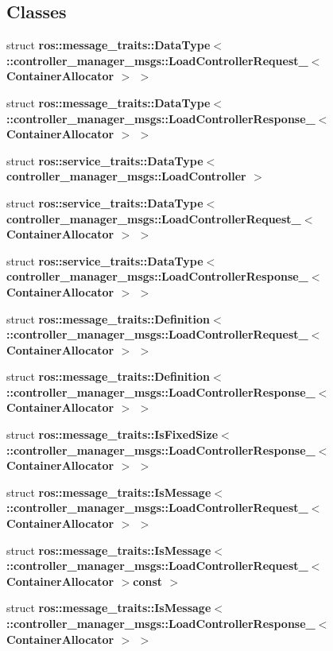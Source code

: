 \subsection*{\-Classes}
\begin{DoxyCompactItemize}
\item 
struct {\bf ros\-::message\-\_\-traits\-::\-Data\-Type$<$ \-::controller\-\_\-manager\-\_\-msgs\-::\-Load\-Controller\-Request\-\_\-$<$ Container\-Allocator $>$ $>$}
\item 
struct {\bf ros\-::message\-\_\-traits\-::\-Data\-Type$<$ \-::controller\-\_\-manager\-\_\-msgs\-::\-Load\-Controller\-Response\-\_\-$<$ Container\-Allocator $>$ $>$}
\item 
struct {\bf ros\-::service\-\_\-traits\-::\-Data\-Type$<$ controller\-\_\-manager\-\_\-msgs\-::\-Load\-Controller $>$}
\item 
struct {\bf ros\-::service\-\_\-traits\-::\-Data\-Type$<$ controller\-\_\-manager\-\_\-msgs\-::\-Load\-Controller\-Request\-\_\-$<$ Container\-Allocator $>$ $>$}
\item 
struct {\bf ros\-::service\-\_\-traits\-::\-Data\-Type$<$ controller\-\_\-manager\-\_\-msgs\-::\-Load\-Controller\-Response\-\_\-$<$ Container\-Allocator $>$ $>$}
\item 
struct {\bf ros\-::message\-\_\-traits\-::\-Definition$<$ \-::controller\-\_\-manager\-\_\-msgs\-::\-Load\-Controller\-Request\-\_\-$<$ Container\-Allocator $>$ $>$}
\item 
struct {\bf ros\-::message\-\_\-traits\-::\-Definition$<$ \-::controller\-\_\-manager\-\_\-msgs\-::\-Load\-Controller\-Response\-\_\-$<$ Container\-Allocator $>$ $>$}
\item 
struct {\bf ros\-::message\-\_\-traits\-::\-Is\-Fixed\-Size$<$ \-::controller\-\_\-manager\-\_\-msgs\-::\-Load\-Controller\-Response\-\_\-$<$ Container\-Allocator $>$ $>$}
\item 
struct {\bf ros\-::message\-\_\-traits\-::\-Is\-Message$<$ \-::controller\-\_\-manager\-\_\-msgs\-::\-Load\-Controller\-Request\-\_\-$<$ Container\-Allocator $>$ $>$}
\item 
struct {\bf ros\-::message\-\_\-traits\-::\-Is\-Message$<$ \-::controller\-\_\-manager\-\_\-msgs\-::\-Load\-Controller\-Request\-\_\-$<$ Container\-Allocator $>$const  $>$}
\item 
struct {\bf ros\-::message\-\_\-traits\-::\-Is\-Message$<$ \-::controller\-\_\-manager\-\_\-msgs\-::\-Load\-Controller\-Response\-\_\-$<$ Container\-Allocator $>$ $>$}
\item 

\end{DoxyCompactItemize}
